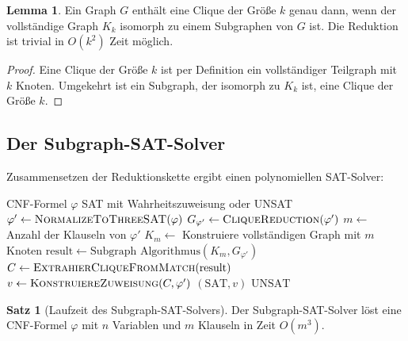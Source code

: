﻿\documentclass[a4paper,12pt]{article}
\theoremstyle{definition}
\newtheorem{satz}{Satz}
\newtheorem{lemma}{Lemma}
\begin{document}
\begin{lemma}
    Ein Graph $G$ enthält eine Clique der Größe $k$ genau dann, wenn der vollständige Graph $K_k$ isomorph zu einem Subgraphen von $G$ ist. Die Reduktion ist trivial in $O(k^2)$ Zeit möglich.
\end{lemma}

\begin{proof}
    Eine Clique der Größe $k$ ist per Definition ein vollständiger Teilgraph mit $k$ Knoten. Umgekehrt ist ein Subgraph, der isomorph zu $K_k$ ist, eine Clique der Größe $k$.
\end{proof}

\subsection{Der Subgraph-SAT-Solver}

Zusammensetzen der Reduktionskette ergibt einen polynomiellen SAT-Solver:

\begin{algorithm}[h]
    \caption{Subgraph-SAT-Solver}\label{alg:subgraph-sat}
    \begin{algorithmic}[1]
        \Require CNF-Formel $\varphi$
        \Ensure SAT mit Wahrheitszuweisung oder UNSAT
        \State $\varphi' \gets \textsc{NormalizeToThreeSAT}(\varphi)$ 
        \State $G_{\varphi'} \gets \textsc{CliqueReduction}(\varphi')$ 
        \State $m \gets$ Anzahl der Klauseln von $\varphi'$
        \State $K_m \gets$ Konstruiere vollständigen Graph mit $m$ Knoten 
        \State $\text{result} \gets \text{Subgraph Algorithmus}(K_m, G_{\varphi'})$ 
            \State $C \gets \textsc{ExtrahierCliqueFromMatch}(\text{result})$ 
            \State $v \gets \textsc{KonstruiereZuweisung}(C, \varphi')$ 
            \State \Return $(\text{SAT}, v)$
        \Else
            \State \Return $\text{UNSAT}$
        \EndIf
    \end{algorithmic}
\end{algorithm}

\begin{satz}[Laufzeit des Subgraph-SAT-Solvers]
    Der Subgraph-SAT-Solver löst eine CNF-Formel $\varphi$ mit $n$ Variablen und $m$ Klauseln in Zeit $O(m^3)$.
\end{satz}
\end{document}
